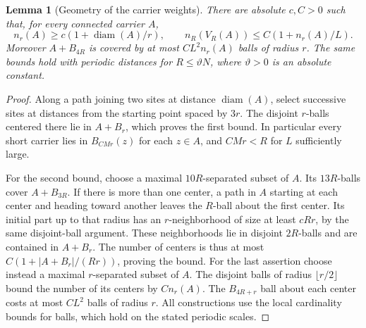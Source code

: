 \documentclass[11pt]{article}
\newtheorem{lemma}[proposition]{Lemma}
\theoremstyle{definition}
\begin{document}
\begin{lemma}[Geometry of the carrier weights]
\label{lem:carrier-geometry}
There are absolute \(c,C>0\) such that, for every connected
carrier \(A\),
\[
 n_r(A)\ge c(1+\operatorname{diam}(A)/r),\qquad
 n_R(V_R(A))\le C(1+n_r(A)/L).
\]
Moreover \(A+B_{4R}\) is covered by at most
\(CL^2n_r(A)\) balls of radius \(r\).
The same bounds hold with periodic distances for \(R\le\vartheta N\),
where \(\vartheta>0\) is an absolute constant.
\end{lemma}
\begin{proof}
Along a path joining two sites at distance \(\operatorname{diam}(A)\),
select successive sites at distances from the starting point
spaced by \(3r\). The disjoint \(r\)-balls centered there lie in
\(A+B_r\), which proves the first bound. In particular every
short carrier lies in \(B_{CMr}(z)\) for each \(z\in A\), and
\(CMr<R\) for \(L\) sufficiently large.

For the second bound, choose a maximal \(10R\)-separated subset
of \(A\). Its \(13R\)-balls cover \(A+B_{3R}\). If there is
more than one center, a path in \(A\) starting at each center
and heading toward another leaves the \(R\)-ball about the
first center. Its initial part up to that radius has an
\(r\)-neighborhood of size at least \(cRr\), by the same
disjoint-ball argument. These neighborhoods lie in disjoint
\(2R\)-balls and are contained in \(A+B_r\). The number of
centers is thus at most \(C(1+|A+B_r|/(Rr))\), proving the
bound. For the last assertion choose instead a maximal
\(r\)-separated subset of \(A\). The disjoint balls of radius
\(\lfloor r/2\rfloor\) bound the number of its centers by
\(Cn_r(A)\). The \(B_{4R+r}\) ball about each center costs
at most \(CL^2\) balls of radius \(r\).
All constructions use the local cardinality bounds for
balls, which hold on the stated periodic scales.
\end{proof}
\end{document}
